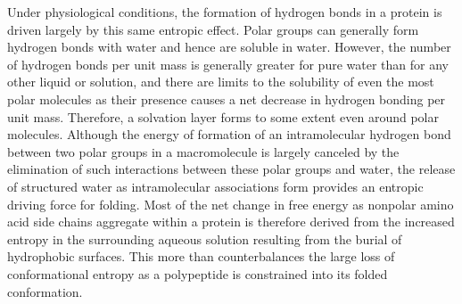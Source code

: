 Under physiological conditions, the formation of hydrogen bonds in a protein is driven largely by this same entropic effect. Polar groups can generally form hydrogen bonds with water and hence are soluble in water. However, the number of hydrogen bonds per unit mass is generally greater for pure water than for any other liquid or solution, and there are limits to the solubility of even the most polar molecules as their presence causes a net decrease in hydrogen bonding per unit mass. Therefore, a solvation layer forms to some extent even around polar molecules. Although the energy of formation of an intramolecular hydrogen bond between two polar groups in a macromolecule is largely canceled by the elimination of such interactions between these polar groups and water, the release of structured water as intramolecular associations form provides an entropic driving force for folding. Most of the net change in free energy as nonpolar amino acid side chains aggregate within a protein is therefore derived from the increased entropy in the surrounding aqueous solution resulting from the burial of hydrophobic surfaces. This more than counterbalances the large loss of conformational entropy as a polypeptide is constrained into its folded conformation. 

